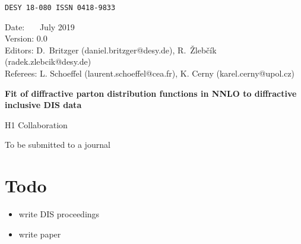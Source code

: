 \documentclass[12pt]{article}
\begin{document}
\begin{titlepage}

\noindent
\begin{flushleft}
{\tt DESY 18-080    \hfill    ISSN 0418-9833} \\
\end{flushleft}

\noindent
Date:      \ \ \ July 2019      \\
Version:   0.0 \\
Editors:   D.\ Britzger (daniel.britzger@desy.de), R.~\v{Z}leb\v{c}\'{i}k (radek.zlebcik@desy.de) \\
Referees:  L. Schoeffel (laurent.schoeffel@cea.fr), K. Cerny (karel.cerny@upol.cz)
\noindent

\vspace{2cm}
\begin{center}
\begin{Large}


{\bf Fit of diffractive parton distribution functions in NNLO to diffractive inclusive DIS data}

\vspace{2cm}

H1 Collaboration

\end{Large}
\end{center}

\vspace{2cm}

\begin{abstract}
\noindent
%
We present the infamous H1DPDF2019 fit.
%
\end{abstract}


\vspace{6cm}

\begin{center} To be submitted to a journal \end{center}

\end{titlepage}
\sloppy

\clearpage
%

\section*{Todo}
\begin{itemize}
\item write DIS proceedings
\item write paper
\end{itemize}
\clearpage
\end{document}
